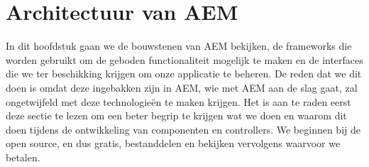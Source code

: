 \documentclass{article}
\begin{document}
	\section{Architectuur van AEM}
	In dit hoofdstuk gaan we de bouwstenen van AEM bekijken, de frameworks die worden gebruikt om de geboden functionaliteit mogelijk te maken en de interfaces die we ter beschikking krijgen om onze applicatie te beheren. De reden dat we dit doen is omdat deze ingebakken zijn in AEM, wie met AEM aan de slag gaat, zal ongetwijfeld met deze technologieën te maken krijgen. Het is aan te raden eerst deze sectie te lezen om een beter begrip te krijgen wat we doen en waarom dit doen tijdens de ontwikkeling van componenten en controllers. We beginnen bij de open source, en dus gratis, bestanddelen en bekijken vervolgens waarvoor we betalen.
\end{document}
